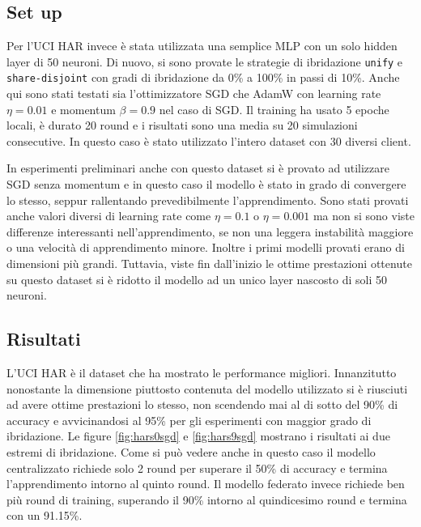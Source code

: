 \subsection{Set up}
Per l'UCI HAR invece è stata utilizzata una semplice MLP con un solo 
hidden layer di 50 neuroni. Di nuovo, si sono provate le 
strategie di ibridazione \texttt{unify} e \texttt{share-disjoint} con 
gradi di ibridazione da 0\% a 100\% in passi di 10\%. Anche qui sono 
stati testati sia l'ottimizzatore SGD che AdamW con learning rate 
\(\eta = 0.01\) e momentum \(\beta = 0.9\) nel caso di SGD. Il 
training ha usato 5 epoche locali, è durato 20 round e i risultati 
sono una media su 20 simulazioni consecutive. In questo caso è stato 
utilizzato l'intero dataset con 30 diversi client.

In esperimenti preliminari anche con questo dataset si è provato ad 
utilizzare SGD senza momentum e in questo caso il modello è stato in 
grado di convergere lo stesso, seppur rallentando prevedibilmente 
l'apprendimento. Sono stati provati anche valori diversi di learning 
rate come \(\eta = 0.1\) o \(\eta = 0.001\) ma non si sono viste 
differenze interessanti nell'apprendimento, se non una leggera 
instabilità maggiore o una velocità di apprendimento minore.
Inoltre i primi modelli provati erano di dimensioni più grandi. 
Tuttavia, viste fin dall'inizio le ottime prestazioni ottenute su 
questo dataset si è ridotto il modello ad un unico layer nascosto di 
soli 50 neuroni.


\subsection{Risultati}
L'UCI HAR è il dataset che ha mostrato le performance migliori.
Innanzitutto nonostante la dimensione piuttosto contenuta del modello
utilizzato si è riusciuti ad avere ottime prestazioni lo stesso, non 
scendendo mai al di sotto del 90\% di accuracy e avvicinandosi al 
95\% per gli esperimenti con maggior grado di ibridazione. Le 
figure \ref{fig:hars0sgd} e \ref{fig:hars9sgd} mostrano i risultati 
ai due estremi di ibridazione.
Come si può vedere anche in questo caso il modello centralizzato 
richiede solo 2 round per superare il 50\% di accuracy e termina 
l'apprendimento intorno al quinto round. Il modello federato invece
richiede ben più round di training, superando il 90\% intorno al 
quindicesimo round e termina con un 91.15\%.

